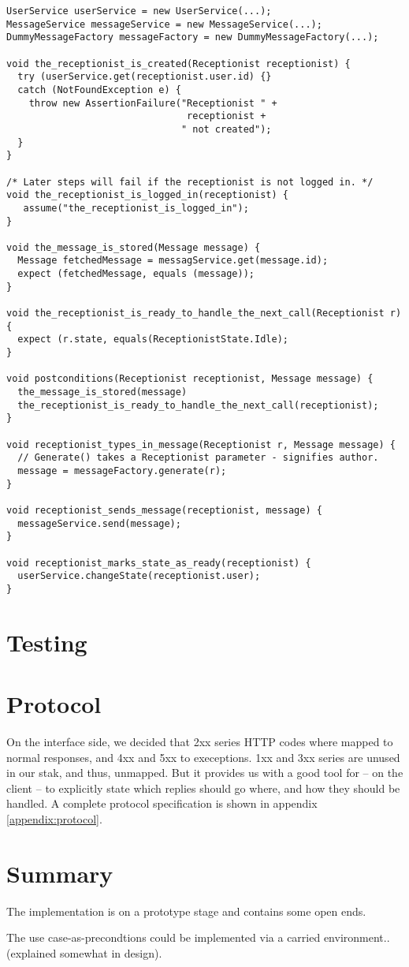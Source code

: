 \begin{lstlisting}[style=Dart, caption=Example template methods (written manually),label={lst:example-template-methods}]
UserService userService = new UserService(...);
MessageService messageService = new MessageService(...);
DummyMessageFactory messageFactory = new DummyMessageFactory(...);
  
void the_receptionist_is_created(Receptionist receptionist) {
  try (userService.get(receptionist.user.id) {}
  catch (NotFoundException e) {
    throw new AssertionFailure("Receptionist " + 
                                receptionist + 
                               " not created");
  }
}

/* Later steps will fail if the receptionist is not logged in. */
void the_receptionist_is_logged_in(receptionist) {
   assume("the_receptionist_is_logged_in");
}

void the_message_is_stored(Message message) {
  Message fetchedMessage = messagService.get(message.id);
  expect (fetchedMessage, equals (message));
}

void the_receptionist_is_ready_to_handle_the_next_call(Receptionist r) {
  expect (r.state, equals(ReceptionistState.Idle);
}

void postconditions(Receptionist receptionist, Message message) {
  the_message_is_stored(message)
  the_receptionist_is_ready_to_handle_the_next_call(receptionist);
}

void receptionist_types_in_message(Receptionist r, Message message) {
  // Generate() takes a Receptionist parameter - signifies author.
  message = messageFactory.generate(r);
}

void receptionist_sends_message(receptionist, message) {
  messageService.send(message);
}

void receptionist_marks_state_as_ready(receptionist) {
  userService.changeState(receptionist.user);
} 

\end{lstlisting}

\section{Testing}

\section{Protocol}
On the interface side, we decided that 2xx series HTTP codes where mapped to normal responses, and 4xx and 5xx to execeptions. 1xx and 3xx series are unused in our stak, and thus, unmapped. But it provides us with a good tool for -- on the client -- to explicitly state which replies should go where, and how they should be handled. A complete protocol specification is shown in appendix \ref{appendix:protocol}.


\section{Summary}
The implementation is on a prototype stage and contains some open ends.

The use case-as-precondtions could be implemented via a carried environment.. (explained somewhat in design).
